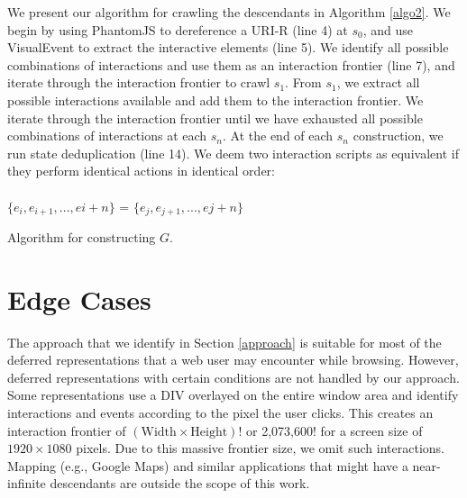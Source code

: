 \documentclass{sig-alternate}
\begin{document}
We present our algorithm for crawling the descendants in Algorithm \ref{algo2}. We begin by using PhantomJS to dereference a URI-R (line 4) at $s_0$, and use VisualEvent to extract the interactive elements (line 5). We identify all possible combinations of interactions and use them as an interaction frontier (line 7), and iterate through the interaction frontier to crawl $s_1$. From $s_1$, we extract all possible interactions available and add them to the interaction frontier. We iterate through the interaction frontier until we have exhausted all possible combinations of interactions at each $s_n$. At the end of each $s_n$ construction, we run state deduplication (line 14). We deem two interaction scripts as equivalent if they perform identical actions in identical order:
\\ \\
\noindent$\{e_{i}, e_{i+1}, ..., e{i+n}\}$ = $\{e_{j}, e_{j+1}, ..., e{j+n}\}$

\begin{algorithm}
 \caption{Algorithm for constructing $G$.}
  \label{algo2}
\end{algorithm}


\section{Edge Cases}
\label{edge}
The approach that we identify in Section \ref{approach} is suitable for most of the deferred representations that a web user may encounter while browsing. However, deferred representations with certain conditions are not handled by our approach. Some representations use a DIV overlayed on the entire window area and identify interactions and events according to the pixel the user clicks. This creates an interaction frontier of 
$(\text{Width} \times \text{Height})!$ or 2,073,600! for a screen size of $1920 \times 1080$ pixels. Due to this massive frontier size, we omit such interactions. Mapping (e.g., Google Maps)  and similar applications that might have a near-infinite descendants are outside the scope of this  work.
\end{document}

